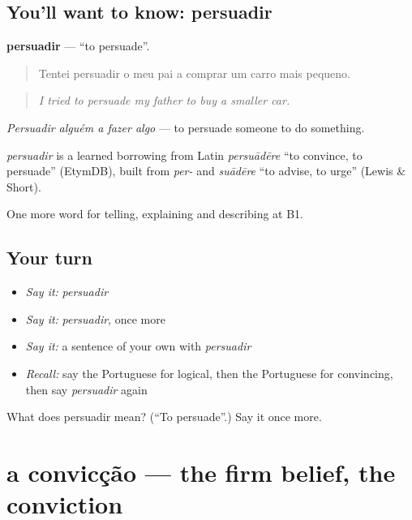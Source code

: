 \subsection*{You'll want to know: persuadir}
\textbf{persuadir} — \textquotedblleft{}to persuade\textquotedblright{}.

\begin{quote}
Tentei persuadir o meu pai a comprar um carro mais pequeno.
\end{quote}

\begin{quote}
\emph{I tried to persuade my father to buy a smaller car.}
\end{quote}

\emph{Persuadir alguém a fazer algo} — to persuade someone to do something.

\begin{cousinweb}
\emph{persuadir} is a learned borrowing from Latin \emph{persuādēre} \textquotedblleft{}to convince, to persuade\textquotedblright{} (EtymDB), built from \emph{per-} and \emph{suādēre} \textquotedblleft{}to advise, to urge\textquotedblright{} (Lewis \& Short).
\end{cousinweb}

\begin{grammarlens}[title={What you've built}]
One more word for telling, explaining and describing at B1.
\end{grammarlens}

\subsection*{Your turn}
\begin{itemize}
\raggedright
  \item \emph{Say it:} \emph{persuadir}
  \item \emph{Say it:} \emph{persuadir}, once more
  \item \emph{Say it:} a sentence of your own with \emph{persuadir}
  \item \emph{Recall:} say the Portuguese for logical, then the Portuguese for convincing, then say \emph{persuadir} again
\end{itemize}

\begin{tcolorbox}[breakable,colback=teal!4,colframe=teal!35!black,title={Before you move on}]
What does persuadir mean? (\textquotedblleft{}To persuade\textquotedblright{}.) Say it once more.
\end{tcolorbox}
\section[a convicção]{a convicção — the firm belief, the conviction}

